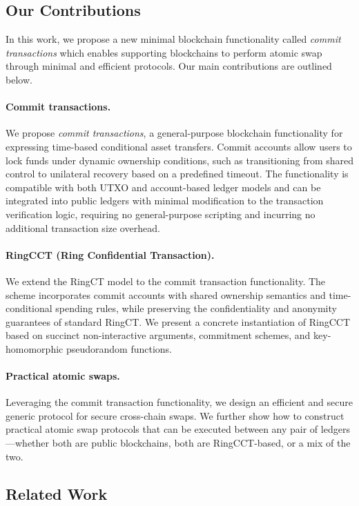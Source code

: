 \subsection{Our Contributions}
In this work, we propose a new minimal blockchain functionality called \emph{commit transactions} which enables supporting blockchains to perform atomic swap through minimal and efficient protocols. Our main contributions are outlined below.
\paragraph*{Commit transactions.} We propose \emph{commit transactions}, a general-purpose blockchain functionality for expressing time-based conditional asset transfers. Commit accounts allow users to lock funds under dynamic ownership conditions, such as transitioning from shared control to unilateral recovery based on a predefined timeout. The functionality is compatible with both UTXO and account-based ledger models and can be integrated into public ledgers with minimal modification to the transaction verification logic, requiring no general-purpose scripting and incurring no additional transaction size overhead.
\paragraph*{RingCCT (Ring Confidential Transaction).} We extend the RingCT model to the commit transaction functionality. The scheme incorporates commit accounts with shared ownership semantics and time-conditional spending rules, while preserving the confidentiality and anonymity guarantees of standard RingCT. We present a concrete instantiation of RingCCT based on succinct non-interactive arguments, commitment schemes, and key-homomorphic pseudorandom functions.
\paragraph*{Practical atomic swaps.} 
Leveraging the commit transaction functionality, we design an efficient and secure generic protocol for secure cross-chain swaps. We further show how to construct practical atomic swap protocols that can be executed between any pair of ledgers—whether both are public blockchains, both are RingCCT-based, or a mix of the two.


\subsection{Related Work}
